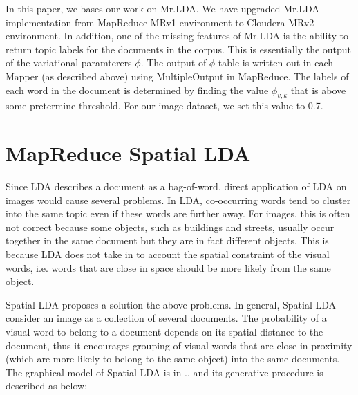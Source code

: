\documentclass{acm_proc_article-sp}
\begin{document}
In this paper, we bases our work on Mr.LDA. We have upgraded Mr.LDA implementation from MapReduce MRv1 environment to Cloudera MRv2 environment. In addition, one of the missing features of Mr.LDA is the ability to return topic labels for the documents in the corpus. This is essentially the output of the variational paramterers $\phi$. The output of $\phi$-table is written out in each Mapper (as described above) using MultipleOutput in MapReduce. The labels of each word in the document is determined by finding the value $\phi_{v,k}$ that is above some pretermine threshold. For our image-dataset, we set this value to 0.7.

\section{MapReduce Spatial LDA}

Since LDA describes a document as a bag-of-word, direct application of LDA on images would cause several problems. In LDA, co-occurring words tend to cluster into the same topic even if these words are further away. For images, this is often 	not correct because some objects, such as buildings and streets, usually occur together in the same document but they are in fact different objects. This is because LDA does not take in to account the spatial constraint of the visual words, i.e. words that are close in space should be more likely from the same object.

Spatial LDA proposes a solution the above problems. In general, Spatial LDA consider an image as a collection of several documents. The probability of a visual word to belong to a document depends on its spatial distance to the document, thus it encourages grouping of visual words that are close in proximity (which are more likely to belong to the same object) into the same documents. The graphical model of Spatial LDA is in .. and its generative procedure is described as below:
\end{document}
